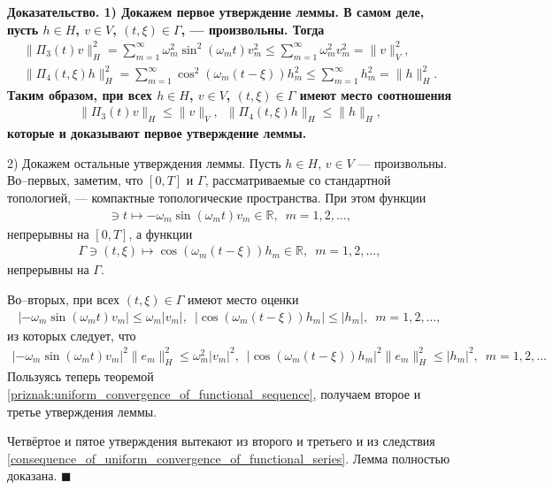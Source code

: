 \documentclass{report}
\newenvironment{Proof}{\par\noindent\bf Доказательство.\rm}{ $\blacksquare$\par}
\begin{document}
\begin{Proof}
1) Докажем первое утверждение леммы. В самом деле, пусть $h\in H$, $v\in V$, $(t,\xi)\in\Gamma$, --- произвольны. Тогда
\begin{gather*}
\|\Pi_3(t)v\|_H^2=\sum\limits_{m=1}^\infty\omega_m^2\sin^2(\omega_mt)v_m^2\leqslant\sum\limits_{m=1}^\infty\omega_m^2v_m^2=\|v\|^2_V,\\
\|\Pi_4(t,\xi)h\|_H^2=\sum\limits_{m=1}^\infty\cos^2(\omega_m(t-\xi))h_m^2\leqslant\sum\limits_{m=1}^\infty h_m^2=\|h\|^2_H.
\end{gather*}
Таким образом, при всех $h\in H$, $v\in V$, $(t,\xi)\in\Gamma$ имеют место соотношения
\begin{gather*}
\|\Pi_3(t)v\|_H\leqslant\|v\|_V,\,\,\,\|\Pi_4(t,\xi)h\|_H\leqslant\|h\|_H,
\end{gather*}
которые и доказывают первое утверждение леммы.

2) Докажем остальные утверждения леммы.  Пусть $h\in H$, $v\in V$ --- произвольны. Во--первых, заметим, что $[0,T]$ и $\Gamma$, рассматриваемые со стандартной топологией, --- компактные
топологические пространства. При этом функции
\begin{gather*}
[0,T]\ni t\mapsto-\omega_m\sin(\omega_mt)v_m\in\mathbb{R},\,\,\,m=1,2,\dots,
\end{gather*}
непрерывны на $[0,T]$, а  функции
\begin{gather*}
\Gamma\ni(t,\xi)\mapsto\cos(\omega_m(t-\xi))h_m\in\mathbb{R},\,\,\,m=1,2,\dots,
\end{gather*}
непрерывны на $\Gamma$.

Во--вторых, при всех  $(t,\xi)\in\Gamma$ имеют место оценки
\begin{gather*}
|-\omega_m\sin(\omega_mt)v_m|\leqslant\omega_m|v_m|,\,\,\,|\cos(\omega_m(t-\xi))h_m|\leqslant|h_m|,\,\,\,m=1,2,\dots,
\end{gather*}
из которых следует, что
\begin{gather*}
|-\omega_m\sin(\omega_mt)v_m|^2\|e_m\|^2_H\leqslant\omega_m^2|v_m|^2,\,\,\, |\cos(\omega_m(t-\xi))h_m|^2\|e_m\|^2_H\leqslant|h_m|^2,\,\,\,
m=1,2,\dots
\end{gather*}
Пользуясь теперь теоремой \ref{priznak:uniform_convergence_of_functional_sequence}, получаем второе и третье утверждения леммы.

Четвёртое и пятое утверждения вытекают из второго и третьего и из следствия \ref{consequence_of_uniform_convergence_of_functional_series}. Лемма полностью доказана.
\end{Proof}
\end{document}
